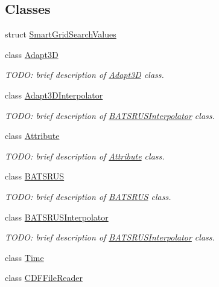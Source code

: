 \subsection*{Classes}
\begin{DoxyCompactItemize}
\item 
struct \hyperlink{structccmc_1_1_smart_grid_search_values}{Smart\-Grid\-Search\-Values}
\item 
class \hyperlink{classccmc_1_1_adapt3_d}{Adapt3\-D}
\begin{DoxyCompactList}\small\item\em T\-O\-D\-O\-: brief description of \hyperlink{classccmc_1_1_adapt3_d}{Adapt3\-D} class. \end{DoxyCompactList}\item 
class \hyperlink{classccmc_1_1_adapt3_d_interpolator}{Adapt3\-D\-Interpolator}
\begin{DoxyCompactList}\small\item\em T\-O\-D\-O\-: brief description of \hyperlink{classccmc_1_1_b_a_t_s_r_u_s_interpolator}{B\-A\-T\-S\-R\-U\-S\-Interpolator} class. \end{DoxyCompactList}\item 
class \hyperlink{classccmc_1_1_attribute}{Attribute}
\begin{DoxyCompactList}\small\item\em T\-O\-D\-O\-: brief description of \hyperlink{classccmc_1_1_attribute}{Attribute} class. \end{DoxyCompactList}\item 
class \hyperlink{classccmc_1_1_b_a_t_s_r_u_s}{B\-A\-T\-S\-R\-U\-S}
\begin{DoxyCompactList}\small\item\em T\-O\-D\-O\-: brief description of \hyperlink{classccmc_1_1_b_a_t_s_r_u_s}{B\-A\-T\-S\-R\-U\-S} class. \end{DoxyCompactList}\item 
class \hyperlink{classccmc_1_1_b_a_t_s_r_u_s_interpolator}{B\-A\-T\-S\-R\-U\-S\-Interpolator}
\begin{DoxyCompactList}\small\item\em T\-O\-D\-O\-: brief description of \hyperlink{classccmc_1_1_b_a_t_s_r_u_s_interpolator}{B\-A\-T\-S\-R\-U\-S\-Interpolator} class. \end{DoxyCompactList}\item 
class \hyperlink{classccmc_1_1_time}{Time}
\item 
class \hyperlink{classccmc_1_1_c_d_f_file_reader}{C\-D\-F\-File\-Reader}

\end{DoxyCompactItemize}
